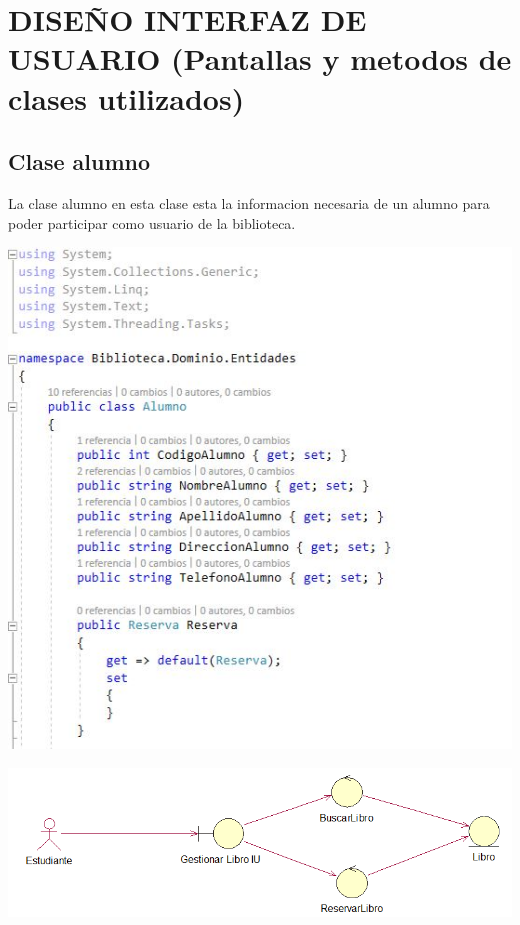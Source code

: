 \section{ DISEÑO INTERFAZ DE USUARIO (Pantallas y metodos de clases utilizados)} 
  \subsection{Clase alumno}
  La clase alumno en esta clase esta la informacion necesaria de un alumno para poder participar como usuario de la biblioteca.
	\begin{center}
	\includegraphics[width=14cm]{./Imagenes/img101} 
	\end{center}

	\begin{center}
	\includegraphics[width=18cm]{./Imagenes/img10} 
	\end{center}
	
 \newpage
